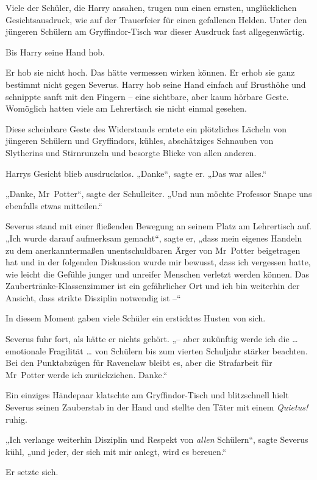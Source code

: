 Viele der Schüler, die Harry ansahen, trugen nun einen ernsten, unglücklichen Gesichtsausdruck, wie auf der Trauerfeier für einen gefallenen Helden. Unter den jüngeren Schülern am Gryffindor-Tisch war dieser Ausdruck fast allgegenwärtig. 

Bis Harry seine Hand hob. 

Er hob sie nicht hoch. Das hätte vermessen wirken können. Er erhob sie ganz bestimmt nicht gegen Severus. Harry hob seine Hand einfach auf Brusthöhe und schnippte sanft mit den Fingern – eine sichtbare, aber kaum hörbare Geste. Womöglich hatten viele am Lehrertisch sie nicht einmal gesehen. 

Diese scheinbare Geste des Widerstands erntete ein plötzliches Lächeln von jüngeren Schülern und Gryffindors, kühles, abschätziges Schnauben von Slytherins und Stirnrunzeln und besorgte Blicke von allen anderen. 

Harrys Gesicht blieb ausdruckslos. „Danke“, sagte er. „Das war alles.“ 

„Danke, Mr~Potter“, sagte der Schulleiter. „Und nun möchte Professor Snape uns ebenfalls etwas mitteilen.“ 

Severus stand mit einer fließenden Bewegung an seinem Platz am Lehrertisch auf. „Ich wurde darauf aufmerksam gemacht“, sagte er, „dass mein eigenes Handeln zu dem anerkanntermaßen unentschuldbaren Ärger von Mr~Potter beigetragen hat und in der folgenden Diskussion wurde mir bewusst, dass ich vergessen hatte, wie leicht die Gefühle junger und unreifer Menschen verletzt werden können. Das Zaubertränke-Klassenzimmer ist ein gefährlicher Ort und ich bin weiterhin der Ansicht, dass strikte Disziplin notwendig ist –“ 

In diesem Moment gaben viele Schüler ein ersticktes Husten von sich. 

Severus fuhr fort, als hätte er nichts gehört. „– aber zukünftig werde ich die … emotionale Fragilität … von Schülern bis zum vierten Schuljahr stärker beachten. Bei den Punktabzügen für Ravenclaw bleibt es, aber die Strafarbeit für Mr~Potter werde ich zurückziehen. Danke.“ 

Ein einziges Händepaar klatschte am Gryffindor-Tisch und blitzschnell hielt Severus seinen Zauberstab in der Hand und stellte den Täter mit einem \emph{Quietus!} ruhig. 

„Ich verlange weiterhin Disziplin und Respekt von \emph{allen} Schülern“, sagte Severus kühl, „und jeder, der sich mit mir anlegt, wird es bereuen.“ 

Er setzte sich. 

